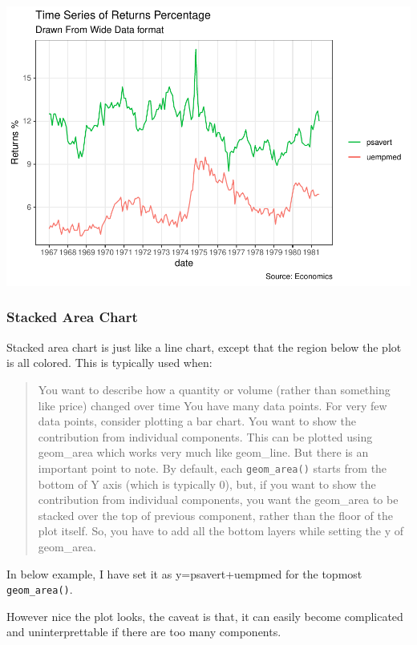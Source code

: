 \documentclass[a4paper]{article}
\begin{document}
\includegraphics{M24-ggplot2_Gallery_files/figure-latex/unnamed-chunk-46-1.pdf}
\newpage

\subsubsection{Stacked Area Chart}\label{stacked-area-chart}

Stacked area chart is just like a line chart, except that the region
below the plot is all colored. This is typically used when:

\begin{quote}
You want to describe how a quantity or volume (rather than something
like price) changed over time You have many data points. For very few
data points, consider plotting a bar chart. You want to show the
contribution from individual components. This can be plotted using
geom\_area which works very much like geom\_line. But there is an
important point to note. By default, each \texttt{geom\_area()} starts
from the bottom of Y axis (which is typically 0), but, if you want to
show the contribution from individual components, you want the
geom\_area to be stacked over the top of previous component, rather than
the floor of the plot itself. So, you have to add all the bottom layers
while setting the y of geom\_area.
\end{quote}

In below example, I have set it as y=psavert+uempmed for the topmost
\texttt{geom\_area()}.

However nice the plot looks, the caveat is that, it can easily become
complicated and uninterprettable if there are too many components.
\end{document}
